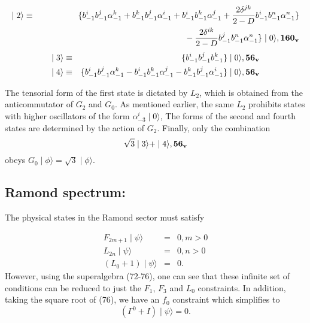 \documentclass[a4paper,a4paper]{article}
\begin{document}
\begin{itemize}
\begin{eqnarray*}
 \mid2\rangle &\equiv&
\{b_{-1}^{i}b_{-1}^{j}\alpha_{-1}^{k}+b_{-1}^{k}b_{-1}^{j}\alpha_{-1}^{i}+b_{-1}^{i}b_{-1}^{k}\alpha_{-1}^{j}+\frac{2\delta^{jk}}{2-D}b_{-1}^{i}b_{-1}^{n}\alpha_{-1}^{n}\}\\
&\phantom{-}&\phantom{\{b_{-1}^{i}b_{-1}^{j}\alpha_{-1}^{k}+b_{-1}^{k}b_{-1}^{j}\alpha_{-1}^{i}+b_{-1}^{i}b_{-1}^{k}\alpha_{-1}^{j}}-\frac{2\delta^{ik}}{2-D}b_{-1}^{j}b_{-1}^{n}\alpha_{-1}^{n}\}\mid0\rangle, {\bf 160_{v}}\\
\end{eqnarray*}
\begin{eqnarray*}
\mid3\rangle &\equiv&
\{b_{-1}^{i}b_{-1}^{j}b_{-1}^{k}\}\mid0\rangle, {\bf 56_{v}}\\
\mid4\rangle &\equiv&
\{b_{-1}^{i}b_{-1}^{j}\alpha_{-1}^{k}-b_{-1}^{i}b_{-1}^{k}\alpha_{-1}^{j}-b_{-1}^{k}b_{-1}^{j}\alpha_{-1}^{i}\}\mid0\rangle,{\bf56_{v}}
\end{eqnarray*}
\end{itemize}

The tensorial form of the first state is dictated by $L_{2}$,
which is obtained from the anticommutator of $G_2$ and $G_0$. As
mentioned earlier, the same $L_2$ prohibits states with higher
oscillators of the form $\alpha_{-3}^{i}\mid0\rangle$, The forms
of the second and fourth states are determined by the action of
$G_{2}$. Finally, only the combination
\[
\sqrt{3}\mid3\rangle + \mid4\rangle,  {\bf 56_{v}}
\]
obeys $G_0\mid\phi\rangle = \sqrt{3}\mid\phi\rangle $.

\subsection{Ramond spectrum:}

The physical states in the Ramond sector must satisfy


\begin{eqnarray}
F_{2m+1}\mid\psi\rangle&=&0,   m>0\\
L_{2n}\mid\psi\rangle&=&0,   n>0\\
(L_{0}+1)\mid\psi\rangle&=&0.
\end{eqnarray}
However, using the superalgebra (72-76), one can see that these
infinite set of conditions can be reduced to just the $F_1$, $ F_3$
and $L_0$ constraints.  In addition, taking the square root of
(76), we have an $f_0$ constraint which simplifies to
\begin{equation}
(\Gamma^0 + I)\mid\psi\rangle = 0.
\end{equation}
\end{document}
